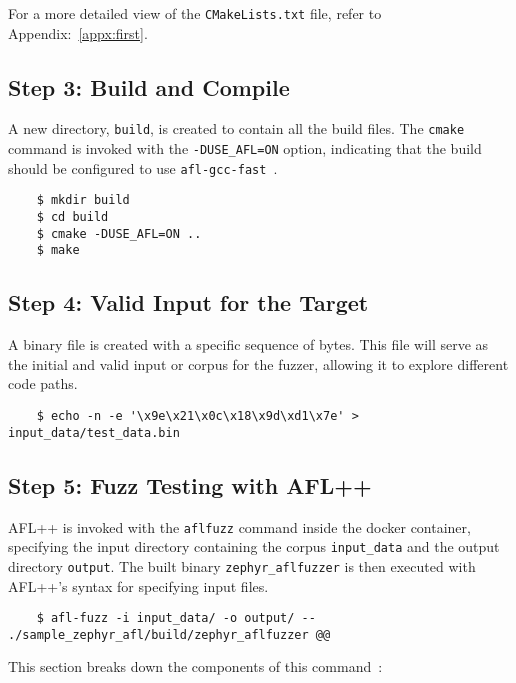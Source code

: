 For a more detailed view of the \texttt{CMakeLists.txt} file, refer to
Appendix:~\ref{appx:first}.

\subsection*{Step 3: Build and Compile}
A new directory, \texttt{build}, is created to contain all the build files.
The \texttt{cmake} command is invoked with the \texttt{-DUSE\_AFL=ON} option,
indicating that the build should be configured to
use \texttt{afl-gcc-fast}~\cite{AFLplusp13:online}.

\begin{verbatim}
    $ mkdir build
    $ cd build
    $ cmake -DUSE_AFL=ON ..
    $ make
\end{verbatim}

\subsection*{Step 4: Valid Input for the Target}
A binary file is created with a specific sequence of bytes.
This file will serve as the initial and valid input or corpus for the fuzzer,
allowing it to explore different code paths.

\begin{verbatim}
    $ echo -n -e '\x9e\x21\x0c\x18\x9d\xd1\x7e' > input_data/test_data.bin
\end{verbatim}

\subsection*{Step 5: Fuzz Testing with AFL++}
AFL++ is invoked with the \texttt{afl\-fuzz} command inside the docker container,
specifying the input directory containing the corpus \texttt{input\_data} and
the output directory \texttt{output}. The built binary \texttt{zephyr\_aflfuzzer}
is then executed with AFL++'s syntax for specifying input files.


\begin{verbatim}
    $ afl-fuzz -i input_data/ -o output/ -- ./sample_zephyr_afl/build/zephyr_aflfuzzer @@
\end{verbatim}

This section breaks down the components of this command~\cite{257204}:

